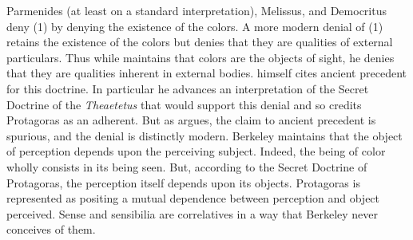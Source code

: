 Parmenides (at least on a standard interpretation), Melissus, and Democritus deny (1) by denying the existence of the colors. A more modern denial of (1) retains the existence of the colors but denies that they are qualities of external particulars. Thus while \citet{Berkeley:1734fk} maintains that colors are the objects of sight, he denies that they are qualities inherent in external bodies. \citet{Berkeley:1744rm} himself cites ancient precedent for this doctrine. In particular he advances an interpretation of the Secret Doctrine of the \emph{Theaetetus} that would support this denial and so credits Protagoras as an adherent. But as \citet{Burnyeat:1982mz} argues, the claim to ancient precedent is spurious, and the denial is distinctly modern. Berkeley maintains that the object of perception depends upon the perceiving subject. Indeed, the being of color wholly consists in its being seen. But, according to the Secret Doctrine of Protagoras, the perception itself depends upon its objects. Protagoras is represented as positing a mutual dependence between perception and object perceived. Sense and sensibilia are correlatives in a way that Berkeley never conceives of them.

